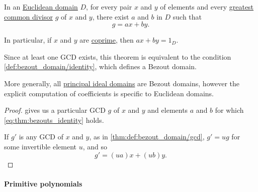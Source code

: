 \begin{theorem}\label{thm:bezouts_identity}
  In an \hyperref[def:euclidean_domain]{Euclidean domain} \( D \), for every pair \( x \) and \( y \) of elements and every \hyperref[def:gcd]{greatest common divisor} \( g \) of \( x \) and \( y \), there exist \( a \) and \( b \) in \( D \) such that
  \begin{equation}\label{eq:thm:bezouts_identity}
    g = ax + by.
  \end{equation}

  In particular, if \( x \) and \( y \) are \hyperref[def:coprime_elements]{coprime}, then \( ax + by = 1_D \).
\end{theorem}
\begin{comments}
  \item Since at least one GCD exists, this theorem is equivalent to the condition \cref{def:bezout_domain/identity}, which defines a Bezout domain.

  More generally, all \hyperref[def:principal_ideal_domain]{principal ideal domains} are Bezout domains, however the explicit computation of coefficients is specific to Euclidean domains.
\end{comments}
\begin{proof}
   gives us a particular GCD \( g \) of \( x \) and \( y \) and elements \( a \) and \( b \) for which \eqref{eq:thm:bezouts_identity} holds.

  If \( g' \) is any GCD of \( x \) and \( y \), as in \cref{thm:def:bezout_domain/gcd}, \( g' = ug \) for some invertible element \( u \), and so
  \begin{equation*}
    g' = (ua)x + (ub)y.
  \end{equation*}
\end{proof}

\paragraph{Primitive polynomials}

